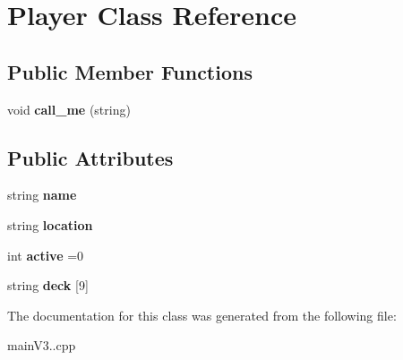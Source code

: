 \hypertarget{class_player}{}\section{Player Class Reference}
\label{class_player}
\subsection*{Public Member Functions}
\begin{DoxyCompactItemize}
\item 
\mbox{\label{class_player_a627eb446e91ea266c55bdf5813fa6e29}} 
void {\bfseries call\+\_\+me} (string)
\end{DoxyCompactItemize}
\subsection*{Public Attributes}
\begin{DoxyCompactItemize}
\item 
\mbox{\label{class_player_acf0355128a99ee20ad9931b760fb2de1}} 
string {\bfseries name}
\item 
\mbox{\label{class_player_a5119fbb00961a39cf2defad41e9c62f9}} 
string {\bfseries location}
\item 
\mbox{\label{class_player_a4d2457090468664aa2bd1699a335fd20}} 
int {\bfseries active} =0
\item 
\mbox{\label{class_player_a773e7beb251b76808506a49d4b8e0f53}} 
string {\bfseries deck} \mbox{[}9\mbox{]}
\end{DoxyCompactItemize}


The documentation for this class was generated from the following file\+:\begin{DoxyCompactItemize}
\item 
main\+V3..\+cpp\end{DoxyCompactItemize}
